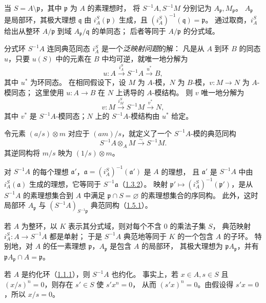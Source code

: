 当 $S=A\setminus\mathfrak p$，其中 $\mathfrak p$ 为 $A$ 的素理想时，
将 $S^{-1}A,S^{-1}M$ 分别记为 $A_{\mathfrak p},M_{\mathfrak p}$。
$A_{\mathfrak p}$ 是局部环，其极大理想 $\mathfrak q$ 由 $i_A^S(\mathfrak p)$ 生成，且
$(i_A^S)^{-1}(\mathfrak q)=\mathfrak p$。
通过取商，$i_A^S$ 给出从整环 $A/\mathfrak p$ 到域 $A_{\mathfrak p}/\mathfrak q$ 的单同态；
后者等同于 $A/\mathfrak p$ 的分式域。

分式环 $S^{-1}A$ 连同典范同态 $i_A^S$ 是一个\emph{泛映射问题}的解：
凡是从 $A$ 到环 $B$ 的同态 $u$，只要 $u(S)$ 中的元素在 $B$ 中均可逆，就唯一地分解为
\[
 u\colon A\xrightarrow{i_A^S}S^{-1}A\xrightarrow{u^*}B,
\]
其中 $u^*$ 为环同态。
在相同假设下，设 $M$ 为 $A$-模，$N$ 为 $B$-模，$v\colon M\to N$ 为 $A$-模同态；
这里使用 $u\colon A\to B$ 在 $N$ 上诱导的 $A$-模结构。
则 $v$ 唯一地分解为
\[
 v\colon M\xrightarrow{i_M^S}S^{-1}M\xrightarrow{v^*}N,
\]
其中 $v^*$ 是 $S^{-1}A$-模同态；$N$ 上的 $S^{-1}A$-模结构由 $u^*$ 给定。

令元素 $(a/s)\otimes m$ 对应于 $(am)/s$，就定义了一个 $S^{-1}A$-模的典范同构
\[
 S^{-1}A\otimes_A M\xrightarrow{\sim}S^{-1}M.
\]
其逆同构将 $m/s$ 映为 $(1/s)\otimes m$。

对 $S^{-1}A$ 的每个理想 $\mathfrak a'$，$\mathfrak a=(i_A^S)^{-1}(\mathfrak a')$ 是 $A$ 的理想，
且 $\mathfrak a'$ 是 $S^{-1}A$ 中由 $i_A^S(\mathfrak a)$ 生成的理想，它等同于 $S^{-1}\mathfrak a$（\hyperlink{para:0:1.3.2}{1.3.2}）。
映射 $\mathfrak p'\mapsto(i_A^S)^{-1}(\mathfrak p')$，是从 $S^{-1}A$ 的素理想集合到
$A$ 中满足 $\mathfrak p\cap S=\varnothing$ 的素理想集合的序同构。
此外，这时局部环 $A_{\mathfrak p}$ 与 $(S^{-1}A)_{S^{-1}\mathfrak p}$ 典范同构（\hyperlink{para:0:1.5.1}{1.5.1}）。

若 $A$ 为整环，以 $K$ 表示其分式域，则对每个不含 $0$ 的乘法子集 $S$，
典范映射 $i_A^S\colon A\to S^{-1}A$ 都是单射；
于是 $S^{-1}A$ 典范地等同于 $K$ 的一个包含 $A$ 的子环。
特别地，对 $A$ 的任一素理想 $\mathfrak p$，$A_{\mathfrak p}$ 是包含 $A$ 的局部环，
其极大理想为 $\mathfrak pA_{\mathfrak p}$，并有 $\mathfrak pA_{\mathfrak p}\cap A=\mathfrak p$。

若 $A$ 是约化环（\hyperlink{para:0:1.1.1}{1.1.1}），则 $S^{-1}A$ 也约化。
事实上，若 $x\in A,s\in S$ 且 $(x/s)^n=0$，则存在 $s'\in S$ 使 $s'x^n=0$，
从而 $(s'x)^n=0$。由假设得 $s'x=0$，所以 $x/s=0$。

